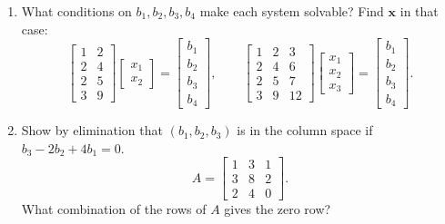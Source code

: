 \documentclass[14pt, a4paper]{article}
\begin{document}
\begin{enumerate}[resume]
    \item What conditions on $b_1, b_2, b_3, b_4$ make each system solvable? Find $\mathbf{x}$ in that case:
          \[
              \begin{bmatrix}
                  1 & 2 \\
                  2 & 4 \\
                  2 & 5 \\
                  3 & 9
              \end{bmatrix}
              \begin{bmatrix} x_1 \\ x_2 \end{bmatrix}
              =
              \begin{bmatrix} b_1 \\ b_2 \\ b_3 \\ b_4 \end{bmatrix},
              \qquad
              \begin{bmatrix}
                  1 & 2 & 3  \\
                  2 & 4 & 6  \\
                  2 & 5 & 7  \\
                  3 & 9 & 12
              \end{bmatrix}
              \begin{bmatrix} x_1 \\ x_2 \\ x_3 \end{bmatrix}
              =
              \begin{bmatrix} b_1 \\ b_2 \\ b_3 \\ b_4 \end{bmatrix}.
          \]

    \item Show by elimination that $(b_1, b_2, b_3)$ is in the column space if $b_3 - 2b_2 + 4b_1 = 0$.
          \[
              A = \begin{bmatrix}
                  1 & 3 & 1 \\
                  3 & 8 & 2 \\
                  2 & 4 & 0
              \end{bmatrix}.
          \]
          What combination of the rows of $A$ gives the zero row?


\end{enumerate}
\end{document}
